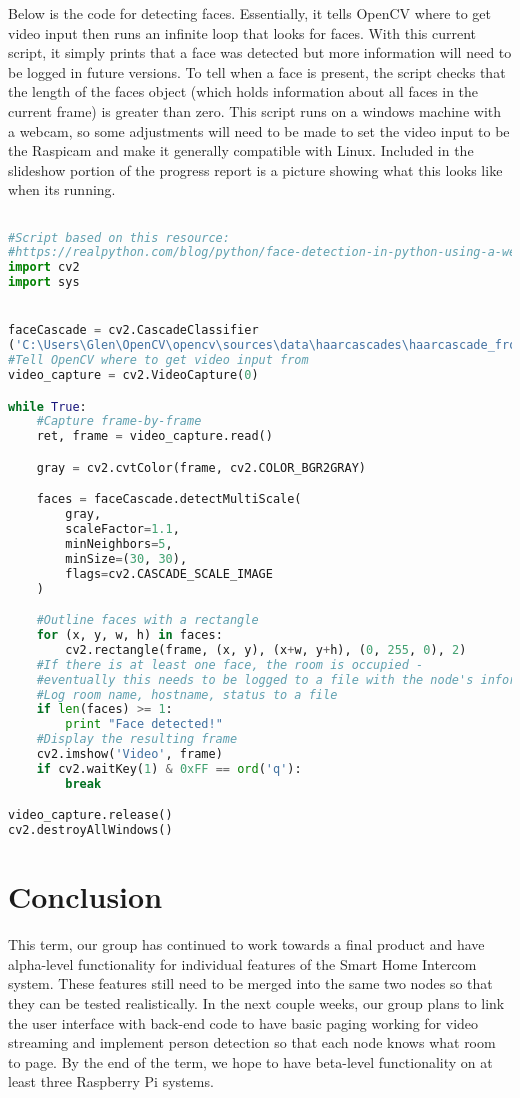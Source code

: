 \documentclass[onecolumn, draftclsnofoot,10pt, compsoc]{IEEEtran}
\begin{document}
Below is the code for detecting faces. Essentially, it tells OpenCV where to get video input then runs an infinite loop that looks for faces. With this current script, it simply prints that a face was detected but more information will need to be logged in future versions. To tell when a face is present, the script checks that the length of the faces object (which holds information about all faces in the current frame) is greater than zero. This script runs on a windows machine with a webcam, so some adjustments will need to be made to set the video input to be the Raspicam and make it generally compatible with Linux. Included in the slideshow portion of the progress report is a picture showing what this looks like when its running.
\begin{lstlisting}[language=Python]

#Script based on this resource: 
#https://realpython.com/blog/python/face-detection-in-python-using-a-webcam/
import cv2
import sys


faceCascade = cv2.CascadeClassifier
('C:\Users\Glen\OpenCV\opencv\sources\data\haarcascades\haarcascade_frontalface_default.xml')
#Tell OpenCV where to get video input from 
video_capture = cv2.VideoCapture(0)

while True:
    #Capture frame-by-frame
    ret, frame = video_capture.read()

    gray = cv2.cvtColor(frame, cv2.COLOR_BGR2GRAY)

    faces = faceCascade.detectMultiScale(
        gray,
        scaleFactor=1.1,
        minNeighbors=5,
        minSize=(30, 30),
        flags=cv2.CASCADE_SCALE_IMAGE
    )

    #Outline faces with a rectangle 
    for (x, y, w, h) in faces:
        cv2.rectangle(frame, (x, y), (x+w, y+h), (0, 255, 0), 2)
    #If there is at least one face, the room is occupied - 
	#eventually this needs to be logged to a file with the node's information 
    #Log room name, hostname, status to a file 
    if len(faces) >= 1:
        print "Face detected!"
    #Display the resulting frame
    cv2.imshow('Video', frame)
    if cv2.waitKey(1) & 0xFF == ord('q'):
        break

video_capture.release()
cv2.destroyAllWindows()

\end{lstlisting}

\section{Conclusion}
This term, our group has continued to work towards a final product and have alpha-level functionality for individual features of the Smart Home Intercom system. These features still need to be merged into the same two nodes so that they can be tested realistically. In the next couple weeks, our group plans to link the user interface with back-end code to have basic paging working for video streaming and implement person detection so that each node knows what room to page. By the end of the term, we hope to have beta-level functionality on at least three Raspberry Pi systems. 
\end{document}
